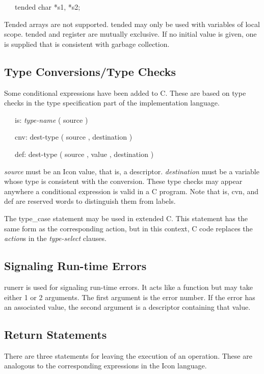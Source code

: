 {\ttfamily\mdseries
\ \ \ tended char *s1, *s2;}

Tended arrays are not supported. tended may only be used with
variables of local scope. tended and register are mutually
exclusive. If no initial value is given, one is supplied that is
consistent with garbage collection.

\subsection{Type Conversions/Type Checks}

Some conditional expressions have been added to C. These are based on
type checks in the type specification part of the implementation
language.

{\ttfamily\mdseries
\ \ \ is: \textit{type-name} ( source )}

{\ttfamily\mdseries
\ \ \ cnv: dest-type ( source , destination )}

{\ttfamily\mdseries
\ \ \ def: dest-type ( source , value , destination )}


\textit{source} must be an Icon value, that is, a
descriptor. \textit{destination} must be a variable whose type is
consistent with the conversion. These type checks may appear anywhere
a conditional expression is valid in a C program.  Note that is, cvn,
and def are reserved words to distinguish them from labels.

The type\_case statement may be used in extended C. This statement has
the same form as the corresponding action, but in this context, C code
replaces the \textit{action}s in the \textit{type-select} clauses.

\subsection{Signaling Run-time Errors}

runerr is used for signaling run-time errors. It acts like a function
but may take either 1 or 2 arguments. The first argument is the error
number. If the error has an associated value, the second argument is a
descriptor containing that value.

\subsection{Return Statements}

There are three statements for leaving the execution of an
operation. These are analogous to the corresponding expressions in the
Icon language.

